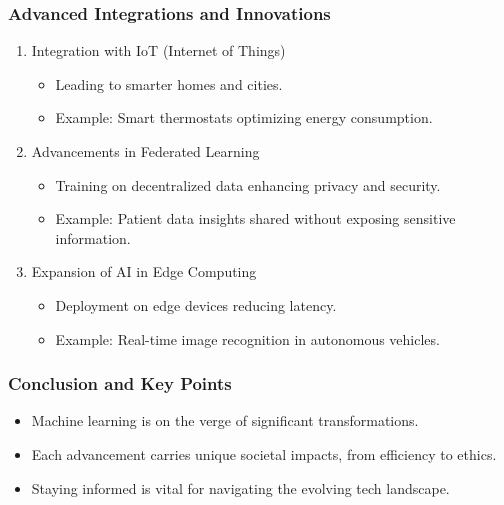 \documentclass[aspectratio=169]{beamer}
\begin{document}
\begin{frame}
  \frametitle{Advanced Integrations and Innovations}
  \begin{enumerate}[resume]
    \item Integration with IoT (Internet of Things)
      \begin{itemize}
        \item Leading to smarter homes and cities.
        \item Example: Smart thermostats optimizing energy consumption.
      \end{itemize}

    \item Advancements in Federated Learning
      \begin{itemize}
        \item Training on decentralized data enhancing privacy and security.
        \item Example: Patient data insights shared without exposing sensitive information.
      \end{itemize}

    \item Expansion of AI in Edge Computing
      \begin{itemize}
        \item Deployment on edge devices reducing latency.
        \item Example: Real-time image recognition in autonomous vehicles.
      \end{itemize}
  \end{enumerate}
\end{frame}

\begin{frame}
  \frametitle{Conclusion and Key Points}
  \begin{itemize}
    \item Machine learning is on the verge of significant transformations.
    \item Each advancement carries unique societal impacts, from efficiency to ethics.
    \item Staying informed is vital for navigating the evolving tech landscape.
  \end{itemize}
\end{frame}
\end{document}

